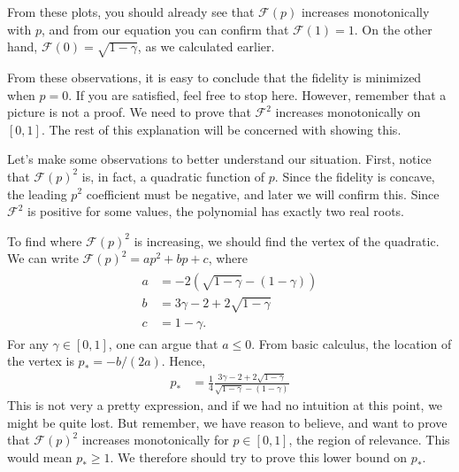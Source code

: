 \documentclass{book}
\begin{document}
    From these plots, you should already see that $\mathcal{F}(p)$ increases monotonically with $p$, and from our equation you can confirm that $\mathcal{F}(1) = 1$. On the other hand, $\mathcal{F}(0) = \sqrt{1-\gamma}$, as we calculated earlier. 

    From these observations, it is easy to conclude that the fidelity is minimized when $p = 0$. If you are satisfied, feel free to stop here. However, remember that a picture is not a proof. We need to prove that $\mathcal{F}^2$ increases monotonically on $[0,1]$. The rest of this explanation will be concerned with showing this. 

    Let's make some observations to better understand our situation. First, notice that $\mathcal{F}(p)^2$ is, in fact, a quadratic function of $p$. Since the fidelity is concave, the leading $p^2$ coefficient must be negative, and later we will confirm this. Since $\mathcal{F}^2$ is positive for some values, the polynomial has exactly two real roots. 

    To find where $\mathcal{F}(p)^2$ is increasing, we should find the vertex of the quadratic. We can write $\mathcal{F}(p)^2 = a p^2 + b p + c$, where
    \begin{align}
    \begin{aligned}
        a &= -2 (\sqrt{1-\gamma}-(1-\gamma)) \\
        b &= 3 \gamma - 2 + 2 \sqrt{1-\gamma} \\
        c &= 1-\gamma.
    \end{aligned}
    \end{align}
    For any $\gamma \in [0,1]$, one can argue that $a \leq 0$. From basic calculus, the location of the vertex is $p_* = -b/(2a)$. Hence,
    \begin{align}
        p_* &= \frac{1}{4} \frac{3 \gamma - 2 + 2 \sqrt{1-\gamma}}{\sqrt{1-\gamma} -(1-\gamma)}
    \end{align}
    This is not very a pretty expression, and if we had no intuition at this point, we might be quite lost. But remember, we have reason to believe, and want to prove that $\mathcal{F}(p)^2$ increases monotonically for $p \in [0,1]$, the region of relevance. This would mean $p_*\geq 1$. We therefore should try to prove this lower bound on $p_*$.
\end{document}
